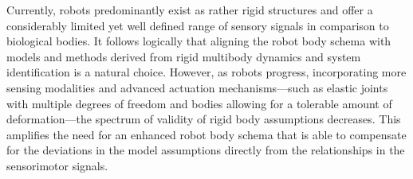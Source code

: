\documentclass[12pt, a4paper]{article}
\newcommand{\redtext}[1]{\textcolor{red}{#1}}
\begin{document}
%
%

Currently, robots predominantly exist as rather rigid structures and offer a considerably limited yet well defined range of sensory signals in comparison to biological bodies. It follows logically that aligning the robot body schema with models and methods derived from rigid multibody dynamics and system identification is a natural choice. However, as robots progress, incorporating more sensing modalities and advanced actuation mechanisms—such as elastic joints with multiple degrees of freedom and bodies allowing for a tolerable amount of deformation—the spectrum of validity of rigid body assumptions decreases. This amplifies the need for an enhanced robot body schema that is able to compensate for the deviations in the model assumptions directly from the relationships in the sensorimotor signals.
\end{document}
